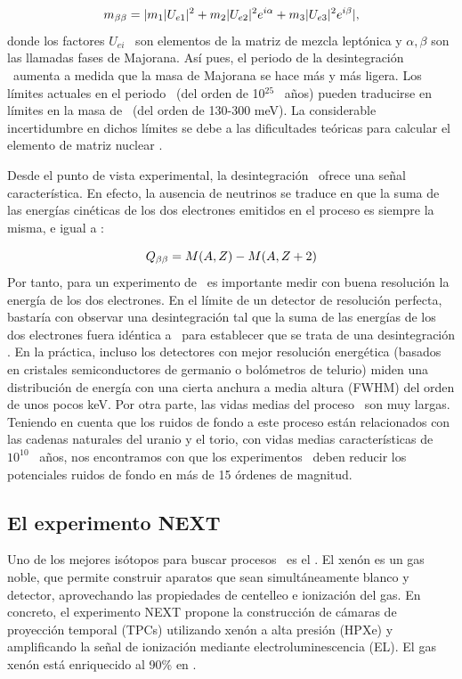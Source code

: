 \begin{equation}
m_{\beta\beta} =|m_1 |U_{e1}|^2 + m_2 |U_{e2}|^2 e^{i\alpha}+ m_3 |U_{e3}|^2 e^{i\beta}| ,
\label{eq.mbb}
\end{equation}
%
donde los factores $U_{ei}$~ son elementos de la matriz de mezcla leptónica y $\alpha,\beta$ son las llamadas fases de Majorana. Así pues, el periodo de la desintegración \bbonu\ aumenta a medida que la masa de Majorana se hace más y más ligera. Los límites actuales en el periodo \Tonu\  (del orden de 10$^{25}$~ años) pueden traducirse en límites en la masa de \mbb\ (del orden de 130-300 meV). La considerable incertidumbre en dichos límites se debe a las dificultades teóricas para calcular el elemento de matriz nuclear \Monu.  

Desde el punto de vista experimental, la desintegración \bbonu\ ofrece una señal característica. En efecto, la ausencia de neutrinos se traduce en que la suma de las energías cinéticas de los dos electrones emitidos en el proceso es siempre la misma, e igual a \Qbb: 
                                    
\begin{equation}
Q_{\beta\beta} =M(A,Z) - M(A, Z+2)
\label{eq.mbb}
\end{equation}
%
Por tanto, para un experimento de \bbonu\ es importante medir con buena resolución  la energía de los dos electrones. En el límite de un detector de resolución perfecta, bastaría con observar una desintegración tal que la suma de las energías de los dos electrones fuera idéntica a \Qbb\  para establecer que se trata de una desintegración \bbonu. En la práctica, incluso los detectores con mejor resolución energética (basados en cristales semiconductores de germanio o bolómetros de telurio) miden una distribución de energía con una cierta anchura a media altura (FWHM) del orden de unos pocos keV. Por otra parte, las vidas medias del proceso \bbonu\ son muy largas. Teniendo en cuenta que los ruidos de fondo a este proceso están relacionados con las cadenas naturales del uranio y el torio, con vidas medias características de $10^{10}$~ años, nos encontramos con que los experimentos \bbonu\ deben reducir los potenciales ruidos de fondo en más de 15 órdenes de magnitud. 

\subsection*{El experimento NEXT}

Uno de los mejores isótopos para buscar procesos \bbonu\ es el \XE. El xenón es un gas noble, que permite construir aparatos que sean simultáneamente blanco y  detector, aprovechando las propiedades de centelleo e ionización del gas. En concreto, el experimento NEXT propone la construcción de cámaras de proyección temporal (TPCs) utilizando xenón a alta presión (HPXe) y amplificando la señal de ionización mediante electroluminescencia (EL). El gas xenón está enriquecido al 90\% en \XE. 


